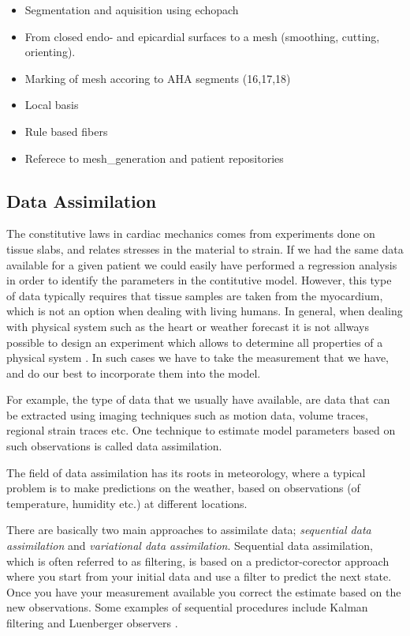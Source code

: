 


\begin{itemize}
  \item Segmentation and aquisition using echopach
  \item From closed endo- and epicardial surfaces to a mesh
    (smoothing, cutting, orienting).
  \item Marking of mesh accoring to AHA segments (16,17,18)
  \item Local basis
  \item Rule based fibers
  \item Referece to mesh{\_}generation and patient repositories
  \end{itemize}


\subsection{Data Assimilation}
The constitutive laws in cardiac mechanics comes from experiments
done on tissue slabs, and relates stresses in the material to strain.
If we had the same data available for a given patient we could easily
have performed a regression analysis in order to identify the
parameters in the contitutive model. However, this type of data
typically requires that tissue samples are taken from the myocardium,
which is not an option when dealing with living humans. In general,
when dealing with physical system such as the heart or weather
forecast it is not allways possible to design an experiment which
allows to determine all properties of a physical system
\cite{chapelle2013fundamental}. In such cases we have to take the
measurement that we have, and do our best to incorporate them into the
model. 

For example, the type of data that we usually have available, are data
that can be extracted using imaging techniques such as motion data,
volume traces, regional strain traces etc. One technique to estimate
model parameters based on such observations is called data assimilation.


The field of data assimilation has its roots in meteorology, where
a typical problem is to make predictions on the weather, based on
observations (of temperature, humidity etc.) at different locations. 


There are basically two main approaches to assimilate data;
\emph{sequential data assimilation} and \emph{variational data
  assimilation}. Sequential data assimilation, which is often
referred to as filtering, is based on a predictor-corector approach
where you start from your initial data and use a filter to predict the
next state. Once you have your measurement available you correct the
estimate based on the new observations. Some examples of sequential
procedures include Kalman filtering and Luenberger observers
\cite{chapelle2013fundamental}.

